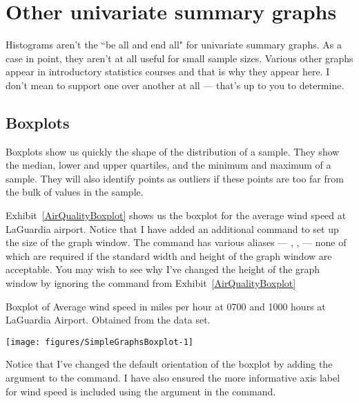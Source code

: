\section{Other univariate summary graphs} 
 
Histograms aren't the ``be all and end all" for univariate summary graphs. As a case in point, they aren't at all useful for small sample sizes. Various other graphs appear in introductory statistics courses and that is why they appear here. I don't mean to support one over another at all --- that's up to you to determine. 
 
\subsection{Boxplots} 
 
Boxplots show us quickly the shape of the distribution of a sample. They show the median, lower and upper quartiles, and the minimum and maximum of a sample. They will also identify points as outliers if these points are too far from the bulk of values in the sample. 
 
Exhibit~\ref{AirQualityBoxplot} shows us the boxplot for the average wind speed at LaGuardia airport. Notice that I have added an additional command to set up the size of the graph window. The  command has various aliases --- , ,  --- none of which are required if the standard width and height of the graph window are acceptable. You may wish to see why I've changed the height of the graph window by ignoring the  command from Exhibit~\ref{AirQualityBoxplot} 
 
\begin{exhibit} 
\begin{center} 
\caption{Boxplot of Average wind speed in miles per hour at 0700 and 1000 hours at LaGuardia Airport. Obtained from the  data set.} 
\label{AirQualityBoxplot} 
\begin{Schunk}

\texttt{[image: figures/SimpleGraphsBoxplot-1]} \end{Schunk}
\end{center} 
\end{exhibit} 
 
Notice that I've changed the default orientation of the boxplot by adding the argument  to the  command. I have also ensured the more informative axis label for wind speed is included using the  argument in the command. 
 
